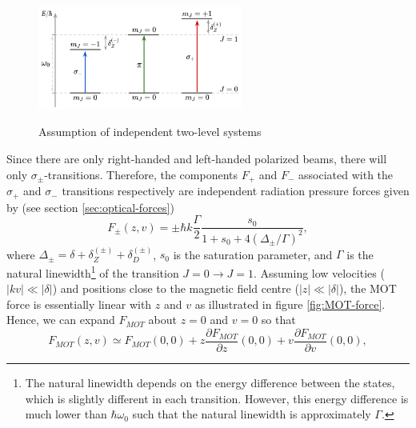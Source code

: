 \begin{figure}[!ht]
	\centering
	\caption{Assumption of independent two-level systems}
	\includegraphics[width=0.6\textwidth]{USPSC-img/Independent-two-level-system.png}
	\label{fig:independent-two-level-system}
\end{figure}

Since there are only right-handed and left-handed polarized beams, there will only $ \sigma_{\pm} $-transitions. Therefore, the components $ F_{+} $ and $ F_{-} $ associated with the $ \sigma_{+} $ and $ \sigma_{-} $ transitions respectively are independent radiation pressure forces given by (see section \ref{sec:optical-forces})
\begin{equation}
	F_{\pm}(z, v) = \pm \hbar k \frac{\Gamma}{2} \frac{s_0}{1 + s_0 + 4(\Delta_{\pm} / \Gamma)^2},
	\label{eq:1D-MOT-force-components}
\end{equation}
where $ \Delta_{\pm} = \delta + \delta_{Z}^{(\pm)} + \delta_{D}^{(\pm)} $, $ s_0 $ is the saturation parameter, and $ \Gamma $ is the natural linewidth\footnote{The natural linewidth depends on the energy difference between the states, which is slightly different in each transition. However, this energy difference is much lower than $ \hbar \omega_0 $ such that the natural linewidth is approximately $ \Gamma $.} of the transition $ J = 0 \rightarrow J = 1 $. Assuming low velocities ($ |kv| \ll |\delta| $) and positions close to the magnetic field centre ($ |z| \ll |\delta| $), the MOT force is essentially linear with $ z $ and $ v $ as illustrated in figure \ref{fig:MOT-force}. Hence, we can expand $ F_{MOT} $ about $ z = 0 $ and $ v = 0 $ so that
\begin{equation}
	F_{MOT}(z, v) \simeq F_{MOT}(0, 0) + z \frac{\partial F_{MOT}}{\partial z}(0, 0) + v \frac{\partial F_{MOT}}{\partial v}(0, 0),
	\label{eq:MOT-force-Taylor-expansion}
\end{equation}

